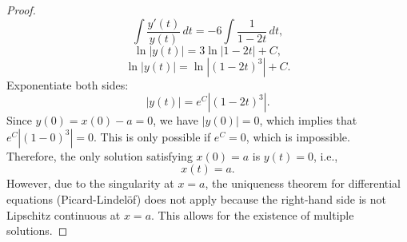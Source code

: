 \documentclass{article}
\begin{document}
\begin{proof}
    \[
        \int \frac{ y'(t) }{ y(t) } \, dt = -6 \int \frac{1}{1 - 2t} \, dt,
    \]
    \[
        \ln | y(t) | = 3 \ln | 1 - 2t | + C,
    \]
    \[
        \ln | y(t) | = \ln | (1 - 2t)^3 | + C.
    \]
    Exponentiate both sides:
    \[
        | y(t) | = e^C | (1 - 2t)^3 |.
    \]
    Since \( y(0) = x(0) - a = 0 \), we have \( | y(0) | = 0 \), which implies that \( e^C | (1 - 0)^3 | = 0 \). This is only possible if \( e^C = 0 \), which is impossible.
    \\
    Therefore, the only solution satisfying \( x(0) = a \) is \( y(t) = 0 \), i.e.,
    \[
        x(t) = a.
    \]
    However, due to the singularity at \( x = a \), the uniqueness theorem for differential equations (Picard-Lindelöf) does not apply because the right-hand side is not Lipschitz continuous at \( x = a \). This allows for the existence of multiple solutions.
\end{proof}
\end{document}
